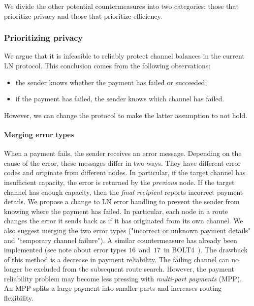 We divide the other potential countermeasures into two categories: those that prioritize privacy and those that prioritize efficiency.


\subsubsection*{Prioritizing privacy}

We argue that it is infeasible to reliably protect channel balances in the current LN protocol.
This conclusion comes from the following observations:
\begin{itemize}
	\item the sender knows whether the payment has failed or succeeded;
	\item if the payment has failed, the sender knows which channel has failed.
\end{itemize}
However, we can change the protocol to make the latter assumption to not hold.

\paragraph{Merging error types}
When a payment fails, the sender receives an error message.
Depending on the cause of the error, these messages differ in two ways.
They have different error codes and originate from different nodes.
In particular, if the target channel has insufficient capacity, the error is returned by the \textit{previous} node.
If the target channel has enough capacity, then the \textit{final recipient} reports incorrect payment details.
We propose a change to LN error handling to prevent the sender from knowing where the payment has failed.
In particular, each node in a route changes the error it sends back as if it has originated from its own channel.
We also suggest merging the two error types ("incorrect or unknown payment details" and "temporary channel failure").
A similar countermeasure has already been implemented (see note about error types $16$~and~$17$~in BOLT4~\cite{Bolt4OnionRouting}).
The drawback of this method is a decrease in payment reliability.
The failing channel can no longer be excluded from the subsequent route search.
However, the payment reliability problem may become less pressing with \textit{multi-part payments} (MPP).
An MPP splits a large payment into smaller parts and increases routing flexibility.

